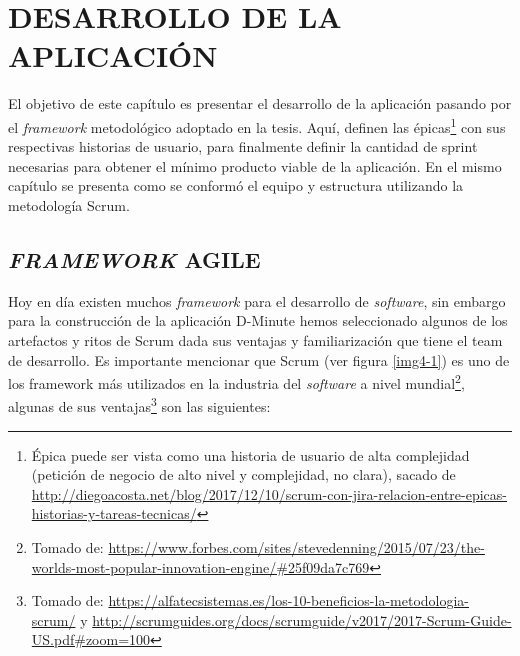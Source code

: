 \section{DESARROLLO DE LA APLICACIÓN}

El objetivo de este capítulo es presentar el desarrollo de la aplicación pasando por el \textit{framework} metodológico adoptado en la tesis. Aquí, definen las épicas\footnote{Épica puede ser vista como una historia de usuario de alta complejidad (petición de negocio de alto nivel y complejidad, no clara), sacado de \url{http://diegoacosta.net/blog/2017/12/10/scrum-con-jira-relacion-entre-epicas-historias-y-tareas-tecnicas/}} con sus respectivas historias de usuario, para finalmente definir la cantidad de sprint necesarias para obtener el mínimo producto viable de la aplicación. En el mismo capítulo se presenta como se conformó el equipo y estructura utilizando la metodología Scrum. 

\subsection{\textit{FRAMEWORK} AGILE}

Hoy en día existen muchos \textit{framework} para el desarrollo de \textit{software}, sin embargo para la construcción de la aplicación D-Minute hemos seleccionado algunos de los artefactos y ritos de Scrum  dada sus ventajas y familiarización que tiene el team de desarrollo. Es importante mencionar que Scrum (ver figura \ref{img4-1}) es uno de los framework más utilizados en la industria del \textit{software} a nivel mundial\footnote{Tomado de: \url{https://www.forbes.com/sites/stevedenning/2015/07/23/the-worlds-most-popular-innovation-engine/\#25f09da7c769}}, algunas de sus ventajas\footnote{Tomado de: \url{https://alfatecsistemas.es/los-10-beneficios-la-metodologia-scrum/} y \url{http://scrumguides.org/docs/scrumguide/v2017/2017-Scrum-Guide-US.pdf\#zoom=100}} son las siguientes:

